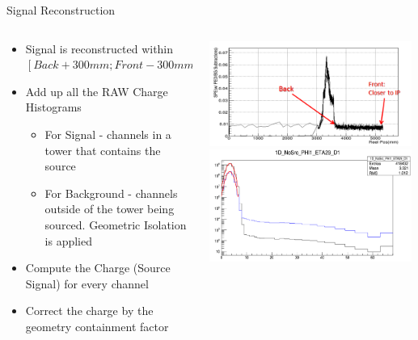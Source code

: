 \documentclass[pdf, 9pt]{beamer}
\begin{document}
  \begin{frame}{Signal Reconstruction}
    \begin{columns}[T]
      \begin{column}{0.48\textwidth}
        \begin{itemize}
          \item Signal is reconstructed within $[Back+300mm; Front-300mm]$
          \item Add up all the RAW Charge Histograms
          \begin{itemize}
            \item For Signal - channels in a tower that contains the source
            \item For Background - channels outside of the tower being sourced. Geometric Isolation is applied
          \end{itemize}
          \item Compute the Charge (Source Signal) for every channel
          \item Correct the charge by the geometry containment factor
        \end{itemize}
      \end{column}
      \begin{column}{0.48\textwidth}
        \includegraphics[width=0.99\textwidth, height=0.4\textheight]{figs/sourcing/Signal_ReelPos.png}\\
        \includegraphics[width=0.99\textwidth, height=0.4\textheight]{figs/sourcing/Signal_Histogram.png}
      \end{column}
    \end{columns}
  \end{frame}
\end{document}
